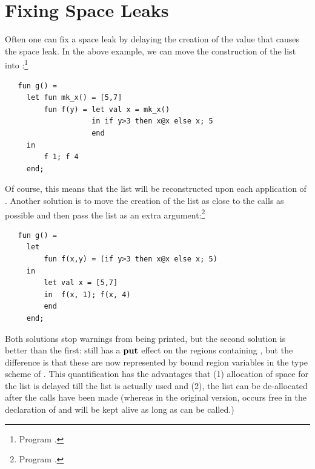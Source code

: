 \documentclass[12pt]{book}
\begin{document}
\section{Fixing Space Leaks}
Often one can fix a space leak by delaying the creation of the value
that causes the space leak. In the above example, we can move the
construction of the list into :\footnote{Program
  .}
\begin{verbatim}
   fun g() = 
     let fun mk_x() = [5,7]
         fun f(y) = let val x = mk_x()
                    in if y>3 then x@x else x; 5 
                    end
     in 
         f 1; f 4
     end;
\end{verbatim}
Of course, this means that the list will be reconstructed upon each
application of . Another solution is to move the creation of
the list as close to the calls as possible and then pass the list as
an extra argument:\footnote{Program .}
\begin{verbatim}
   fun g() = 
     let 
         fun f(x,y) = (if y>3 then x@x else x; 5)
     in 
         let val x = [5,7]
         in  f(x, 1); f(x, 4)
         end
     end;
\end{verbatim}
Both solutions stop warnings from being printed, but the second
solution is better than the first:  still has a $\mathop{\bf put}\nolimits$ effect on
the regions containing , but the difference is that these are
now represented by bound region variables in the type scheme of
. This quantification has the advantages that (1) allocation
of space for the list is delayed till the list is actually used and
(2), the list can be de-allocated after the calls have been made
(whereas in the original version,  occurs free in the
declaration of  and will be kept alive as long as 
can be called.)
\end{document}
